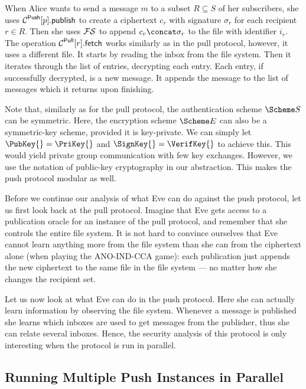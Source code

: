 When Alice wants to send a message \(m\) to a subset \(R\subseteq S\) of her 
subscribers, she uses \(\pnpub{p}\) to create a ciphertext \(c_r\) with 
signature \(\sigma_r\) for each recipient \(r\in R\).
Then she uses \(\FS\) to append \(c_r\concat \sigma_r\) to the file with 
identifier \(i_r\).
The operation \(\pget{r}\) works similarly as in the pull protocol, however, it 
uses a different file.
It starts by reading the inbox from the file system.
Then it iterates through the list of entries, decrypting each entry.
Each entry, if successfully decrypted, is a new message.
It appends the message to the list of messages which it returns upon 
finishing.

Note that, similarly as for the pull protocol, the authentication scheme \(\S\) 
can be symmetric.
Here, the encryption scheme \(\E\) can also be a symmetric-key scheme, provided 
it is key-private.
We can simply let \(\PubKey{} = \PriKey{}\) and \(\SignKey{} = \VerifKey{}\) to 
achieve this.
This would yield private group communication with few key exchanges.
However, we use the notation of public-key cryptography in our abstraction.
This makes the push protocol modular as well.

Before we continue our analysis of what Eve can do against the push protocol, 
let us first look back at the pull protocol.
Imagine that Eve gets access to a publication oracle for an instance of the 
pull protocol, and remember that she controls the entire file system.
It is not hard to convince ourselves that Eve cannot learn anything more from 
the file system than she can from the ciphertext alone (when playing the 
ANO-IND-CCA game): each publication just appends the new ciphertext to the same 
file in the
file system --- no matter how she changes the recipient set.

Let us now look at what Eve can do in the push protocol.
Here she can actually learn information by observing the file system.
Whenever a message is published she learns which inboxes are used to get 
messages from the publisher, thus she can relate several inboxes.
Hence, the security analysis of this protocol is only interesting when the 
protocol is run in parallel.

\subsection{Running Multiple Push Instances in Parallel}
\label{ParallelPush}

